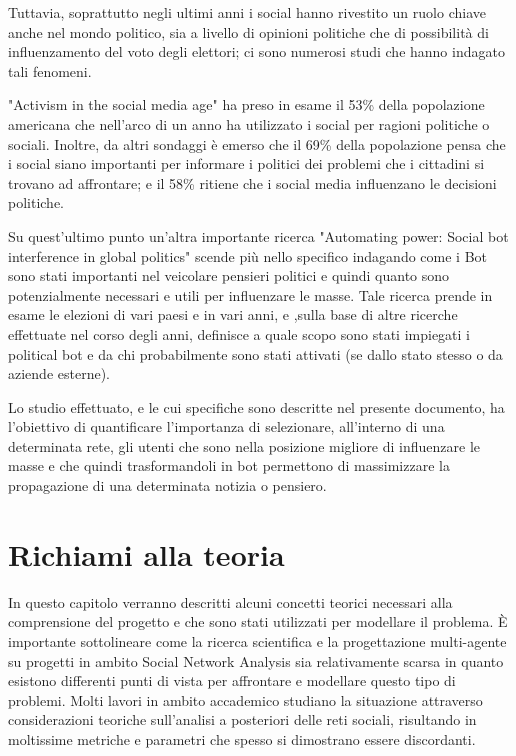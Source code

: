 \documentclass[11pt]{article}
\begin{document}
Tuttavia, soprattutto negli ultimi anni i social hanno rivestito un ruolo chiave anche nel mondo politico, sia a livello di opinioni politiche che di possibilità di influenzamento del voto degli elettori; ci sono numerosi studi che hanno indagato tali fenomeni.

"Activism in the social media age" \cite{ActivismSocialMedia} ha preso in esame il 53\% della popolazione americana che nell'arco di un anno ha utilizzato i social per ragioni politiche o sociali. Inoltre, da altri sondaggi è emerso che il 69\% della popolazione pensa che i social siano importanti per informare i politici dei problemi che i cittadini si trovano ad affrontare; e il 58\% ritiene che i social media influenzano le decisioni politiche.

Su quest'ultimo punto un’altra importante ricerca "Automating power: Social bot interference in global politics" \cite{AutomaticPower} scende più nello specifico indagando come i Bot sono stati importanti nel veicolare pensieri politici e quindi quanto sono potenzialmente necessari e utili per influenzare le masse. Tale ricerca prende in esame le elezioni di vari paesi e in vari anni, e ,sulla base di altre ricerche effettuate nel corso degli anni, definisce a quale scopo sono stati impiegati i political bot e da chi probabilmente sono stati attivati (se dallo stato stesso o da aziende esterne).

Lo studio effettuato, e le cui specifiche sono descritte nel presente documento, ha l’obiettivo di quantificare l’importanza di selezionare, all’interno di una determinata rete, gli utenti che sono nella posizione migliore di influenzare le masse e che quindi trasformandoli in bot permettono di massimizzare la propagazione di una determinata notizia o pensiero.


\section{Richiami alla teoria}

In questo capitolo verranno descritti alcuni concetti teorici necessari alla comprensione del progetto e che sono stati utilizzati per modellare il problema.
È importante sottolineare come la ricerca scientifica e la progettazione multi-agente su progetti in ambito Social Network Analysis sia relativamente scarsa in quanto esistono differenti punti di vista per affrontare e modellare questo tipo di problemi. Molti lavori in ambito accademico studiano la situazione attraverso considerazioni teoriche sull'analisi a posteriori delle reti sociali, risultando in moltissime metriche e parametri che spesso si dimostrano essere discordanti.
\end{document}
